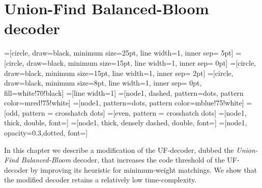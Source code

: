 \chapter{Union-Find Balanced-Bloom decoder}\label{ch:ufbb}

=[circle, draw=black, minimum size=25pt, line width=1, inner sep= 5pt]
=[circle, draw=black, minimum size=15pt, line width=1, inner sep= 0pt]
=[circle, draw=black, minimum size=15pt, line width=1, inner sep= 2pt]
=[circle, draw=black, minimum size=8pt, line width=1, inner sep= 0pt, fill=white!70!black]
=[line width=1]
\tikzfading[name=fade right, left color=transparent!0, right color=transparent!100]
=[node1, dashed, pattern=dots, pattern color=mred!75!white]
=[node1, pattern=dots, pattern color=mblue!75!white]
=[odd, pattern = crosshatch dots]
=[even, pattern = crosshatch dots]
=[node1, thick, double, font=\footnotesize]
=[node1, thick, densely dashed, double, font=\footnotesize]
=[node1, opacity=0.3,dotted, font=\footnotesize]


In this chapter we describe a modification of the UF-decoder, dubbed the \emph{Union-Find Balanced-Bloom} decoder, that increases the code threshold of the UF-decoder by improving its heuristic for minimum-weight matchings. We show that the modified decoder retains a relatively low time-complexity. 

